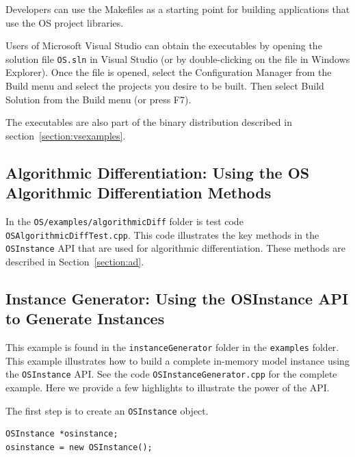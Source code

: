 \documentclass[11pt]{article}
\renewcommand{\_}{{\char"5F}}
\renewcommand{\{}{{\char"7B}}
\renewcommand{\}}{{\char"7D}}
\renewcommand{\^}{{\char"0D}}
\renewcommand{\'}{{\char"0D}}
\begin{document}
\begin{enumerate}[Step 1:]
Developers can use the Makefiles as a starting point for building applications that use the 
OS project libraries.

\medskip
Users of Microsoft Visual Studio can obtain the executables by opening the solution file 
{\tt OS.sln} in
Visual Studio (or by double-clicking on the file in Windows Explorer). Once the file is opened, 
select the Configuration Manager from the Build menu and select the projects you desire to be built. 
Then select Build Solution from the Build menu (or press F7). 

The executables are also part of the binary distribution described in section~\ref{section:vsexamples}.


\subsection{Algorithmic Differentiation:  Using the OS Algorithmic Differentiation Methods}\label{section:cppad}

In the {\tt OS/examples/algorithmicDiff} folder is test code {\tt OSAlgorithmicDiffTest.cpp}. This code
illustrates the key methods in the {\tt OSInstance} API that are used for
algorithmic differentiation.   These methods are described in Section~\ref{section:ad}.



\subsection{Instance Generator: Using the OSInstance API to Generate Instances}\label{section:exampleOSInstanceGeneration}

This example is found in the {\tt instanceGenerator} folder in the {\tt examples} folder. This example illustrates
how to build a complete in-memory model instance using the {\tt OSInstance} API.
See the code {\tt OSInstanceGenerator.cpp} for the complete example. Here we provide a few highlights to illustrate
the power of the API.

The first step is to create an {\tt OSInstance} object.
\begin{verbatim}
OSInstance *osinstance;
osinstance = new OSInstance();
\end{verbatim}


\end{enumerate}
\end{document}
